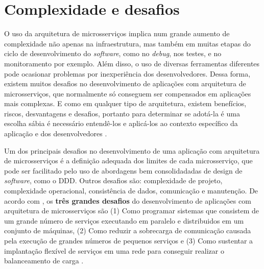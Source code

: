 
\section{Complexidade e desafios}

O uso da arquitetura de microsserviços implica num grande aumento de complexidade não apenas na infraestrutura, mas também em muitas etapas do ciclo de desenvolvimento do \emph{software}, como no \emph{debug}, nos testes, e no monitoramento por exemplo. Além disso, o uso de diversas ferramentas diferentes pode ocasionar problemas por inexperiência dos desenvolvedores. Dessa forma, existem muitos desafios no desenvolvimento de aplicações com arquitetura de microsserviços, que normalmente só conseguem ser compensados em aplicações mais complexas. E como em qualquer tipo de arquitetura, existem benefícios, riscos, desvantagens e desafios, portanto para determinar se adotá-la é uma escolha sábia é necessário entendê-los e aplicá-los ao contexto específico da aplicação e dos desenvolvedores \cite{top10-microservices-challenges,martin-fowler-microservice-tradeoffs}.

Um dos principais desafios no desenvolvimento de uma aplicação com arquitetura de microsserviços é a definição adequada dos limites de cada microsserviço, que pode ser facilitado pelo uso de abordagens bem consolidadadas de design de \emph{software}, como o DDD. Outros desafios são: complexidade de projeto, complexidade operacional, consistência de dados, comunicação e manutenção. De acordo com , os \textbf{três grandes desafios} do desenvolvimento de aplicações com arquitetura de microsserviços são (1) Como programar sistemas que consistem de um grande número de serviços executando em paralelo e distribuidos em um conjunto de máquinas, (2) Como reduzir a sobrecarga de comunicação causada pela execução de grandes números de pequenos serviços e (3) Como sustentar a implantação flexível de serviços em uma rede para conseguir realizar o balanceamento de carga \cite{martin-fowler-monolith-first}.

